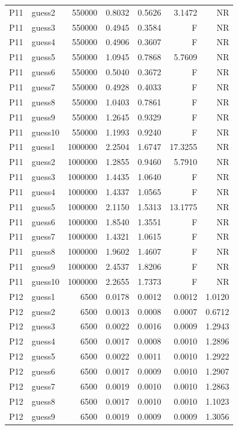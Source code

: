 {\begin{longtable}{llrrrrr}
P11 & guess2 & 550000 & 0.8032 & 0.5626 & 3.1472 & NR \\
P11 & guess3 & 550000 & 0.4945 & 0.3584 & F & NR \\
P11 & guess4 & 550000 & 0.4906 & 0.3607 & F & NR \\
P11 & guess5 & 550000 & 1.0945 & 0.7868 & 5.7609 & NR \\
P11 & guess6 & 550000 & 0.5040 & 0.3672 & F & NR \\
P11 & guess7 & 550000 & 0.4928 & 0.4033 & F & NR \\
P11 & guess8 & 550000 & 1.0403 & 0.7861 & F & NR \\
P11 & guess9 & 550000 & 1.2645 & 0.9329 & F & NR \\
P11 & guess10 & 550000 & 1.1993 & 0.9240 & F & NR \\
P11 & guess1 & 1000000 & 2.2504 & 1.6747 & 17.3255 & NR \\
P11 & guess2 & 1000000 & 1.2855 & 0.9460 & 5.7910 & NR \\
P11 & guess3 & 1000000 & 1.4435 & 1.0640 & F & NR \\
P11 & guess4 & 1000000 & 1.4337 & 1.0565 & F & NR \\
P11 & guess5 & 1000000 & 2.1150 & 1.5313 & 13.1775 & NR \\
P11 & guess6 & 1000000 & 1.8540 & 1.3551 & F & NR \\
P11 & guess7 & 1000000 & 1.4321 & 1.0615 & F & NR \\
P11 & guess8 & 1000000 & 1.9602 & 1.4607 & F & NR \\
P11 & guess9 & 1000000 & 2.4537 & 1.8206 & F & NR \\
P11 & guess10 & 1000000 & 2.2655 & 1.7373 & F & NR \\
P12 & guess1 & 6500 & 0.0178 & 0.0012 & 0.0012 & 1.0120 \\
P12 & guess2 & 6500 & 0.0013 & 0.0008 & 0.0007 & 0.6712 \\
P12 & guess3 & 6500 & 0.0022 & 0.0016 & 0.0009 & 1.2943 \\
P12 & guess4 & 6500 & 0.0017 & 0.0008 & 0.0010 & 1.2896 \\
P12 & guess5 & 6500 & 0.0022 & 0.0011 & 0.0010 & 1.2922 \\
P12 & guess6 & 6500 & 0.0017 & 0.0009 & 0.0010 & 1.2907 \\
P12 & guess7 & 6500 & 0.0019 & 0.0010 & 0.0010 & 1.2863 \\
P12 & guess8 & 6500 & 0.0017 & 0.0010 & 0.0010 & 1.1023 \\
P12 & guess9 & 6500 & 0.0019 & 0.0009 & 0.0009 & 1.3056 \\

\end{longtable}}
